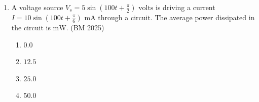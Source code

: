 \begin{enumerate}[label=\thesubsection.\arabic*, ref=\thesubsection.\theenumi]
\hfill  (BM 2025)
\begin{multicols}{4}
\begin{enumerate}
\setlength{\itemsep}{0pt}
    \item $7$
    \item $11$
    \item $9$
    \item $12$
\end{enumerate}
\end{multicols}
\solution
By definition, the median
\begin{align}
a = 3
\end{align}
and 
the mean is
\begin{align}
	\frac{-5 + 1 + a + 5 + b}{5} &= 3
	\\
\implies b = 11
\end{align}
upon substituting $a = 3$. 
The following code verifies the solution.
\begin{lstlisting}
Codes/bm9.py
\end{lstlisting}
\item A voltage source $V_s = 5\sin\left(100t + \frac{\pi}{2}\right)\text{ volts}$ is driving a current $I = 10\sin\left(100t + \frac{\pi}{6}\right)\text{ mA}$ through a circuit. The average power dissipated in the circuit is \underline{\hspace{2cm}} $\text{mW}$.
\hfill  (BM 2025)
\begin{multicols}{4}
\begin{enumerate}
\setlength{\itemsep}{0pt}
    \item $0.0$
    \item $12.5$
    \item $25.0$
    \item $50.0$
\end{enumerate}
\end{multicols}
\solution



\end{enumerate}
